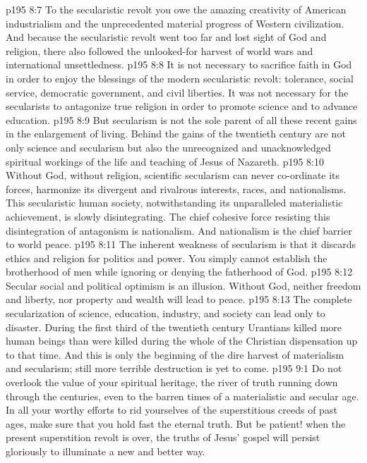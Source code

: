 \vs p195 8:7 To the secularistic revolt you owe the amazing creativity of American industrialism and the unprecedented material progress of Western civilization. And because the secularistic revolt went too far and lost sight of God and  religion, there also followed the unlooked\hyp{}for harvest of world wars and international unsettledness.
\vs p195 8:8 It is not necessary to sacrifice faith in God in order to enjoy the blessings of the modern secularistic revolt: tolerance, social service, democratic government, and civil liberties. It was not necessary for the secularists to antagonize true religion in order to promote science and to advance education.
\vs p195 8:9 But secularism is not the sole parent of all these recent gains in the enlargement of living. Behind the gains of the twentieth century are not only science and secularism but also the unrecognized and unacknowledged spiritual workings of the life and teaching of Jesus of Nazareth.
\vs p195 8:10 Without God, without religion, scientific secularism can never co\hyp{}ordinate its forces, harmonize its divergent and rivalrous interests, races, and nationalisms. This secularistic human society, notwithstanding its unparalleled materialistic achievement, is slowly disintegrating. The chief cohesive force resisting this disintegration of antagonism is nationalism. And nationalism is the chief barrier to world peace.
\vs p195 8:11 The inherent weakness of secularism is that it discards ethics and religion for politics and power. You simply cannot establish the brotherhood of men while ignoring or denying the fatherhood of God.
\vs p195 8:12 Secular social and political optimism is an illusion. Without God, neither freedom and liberty, nor property and wealth will lead to peace.
\vs p195 8:13 The complete secularization of science, education, industry, and society can lead only to disaster. During the first third of the twentieth century Urantians killed more human beings than were killed during the whole of the Christian dispensation up to that time. And this is only the beginning of the dire harvest of materialism and secularism; still more terrible destruction is yet to come.
\vs p195 9:1 Do not overlook the value of your spiritual heritage, the river of truth running down through the centuries, even to the barren times of a materialistic and secular age. In all your worthy efforts to rid yourselves of the superstitious creeds of past ages, make sure that you hold fast the eternal truth. But be patient! when the present superstition revolt is over, the truths of Jesus’ gospel will persist gloriously to illuminate a new and better way.
